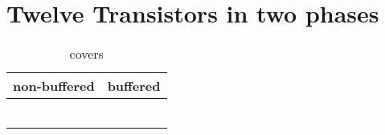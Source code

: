 \section{Twelve Transistors in two phases}

\begin{table}[ht]
\centering
\caption*{covers}

\begin{tabular}{cc}
    \toprule
    non-buffered & buffered \\
    \midrule

    \nameref{cell:AAAOI222} & \nameref{cell:AAAO222} \\
    \nameref{cell:OOOAI222} & \nameref{cell:OOOA222} \\
    \nameref{cell:AAOI321} & \nameref{cell:AAO321} \\
    \nameref{cell:OOAI321} & \nameref{cell:OOA321} \\
    \nameref{cell:AAOI33} & \nameref{cell:AAO33} \\
    \nameref{cell:OOAI33} & \nameref{cell:OOA33}

\end{tabular}

\end{table}

 
 
 
 
 
 
